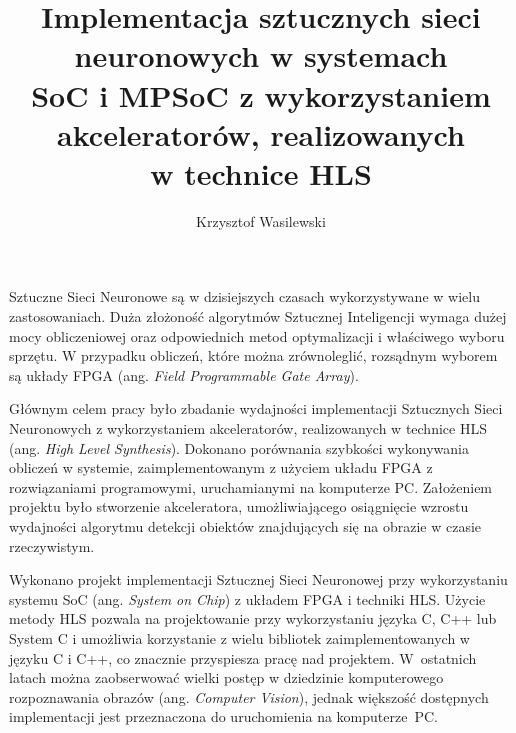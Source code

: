 \documentclass[
    left=2.5cm,         %
    right=2.5cm,        %
    top=2.5cm,          %
    bottom=3cm,         %
    bindingoffset=6mm,  %
    nohyphenation=false %
]{eiti/eiti-thesis}
\begin{document}
\MasterThesis %
{}
\title{
    Implementacja sztucznych sieci neuronowych w systemach\\
    SoC i MPSoC z wykorzystaniem akceleratorów, realizowanych\\w technice HLS
}
\author{Krzysztof Wasilewski}
\date{\the\year}
\maketitle

\cleardoublepage %

\streszczenie
Sztuczne Sieci Neuronowe są w dzisiejszych czasach wykorzystywane w wielu 
zastosowaniach. Duża złożoność algorytmów Sztucznej Inteligencji wymaga 
dużej mocy obliczeniowej oraz odpowiednich metod optymalizacji 
i właściwego wyboru sprzętu. W przypadku obliczeń, które 
można zrównoleglić, rozsądnym wyborem są układy FPGA (ang. \emph{Field 
Programmable Gate Array}). 

Głównym celem pracy było zbadanie wydajności implementacji Sztucznych Sieci Neuronowych 
z wykorzystaniem akceleratorów, realizowanych w technice HLS (ang. \emph{High 
Level Synthesis}). Dokonano porównania szybkości wykonywania obliczeń w systemie,
zaimplementowanym z użyciem układu FPGA z rozwiązaniami programowymi, 
uruchamianymi na komputerze PC. Założeniem projektu było stworzenie akceleratora, 
umożliwiającego osiągnięcie wzrostu wydajności algorytmu detekcji obiektów znajdujących się na 
obrazie w czasie rzeczywistym. 

Wykonano projekt implementacji Sztucznej Sieci Neuronowej przy wykorzystaniu systemu 
SoC (ang. \emph{System on Chip}) z układem FPGA i techniki HLS. 
Użycie metody HLS pozwala na projektowanie przy wykorzystaniu 
języka C, C++ lub System C i umożliwia korzystanie z wielu bibliotek zaimplementowanych 
w języku C i C++, co znacznie przyspiesza pracę nad projektem. W~ostatnich latach można 
zaobserwować wielki postęp w dziedzinie komputerowego rozpoznawania obrazów 
(ang. \emph{Computer Vision}), jednak większość dostępnych implementacji jest 
przeznaczona do uruchomienia na komputerze~PC.
\end{document}
